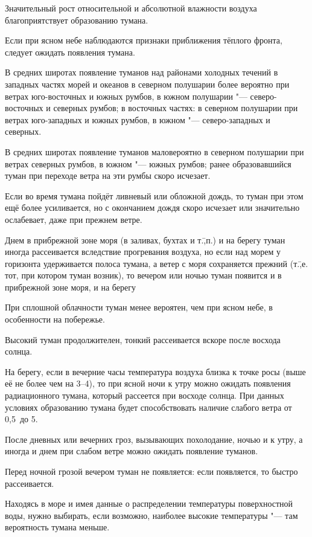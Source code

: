  Значительный рост относительной и абсолютной влажности воздуха
благоприятствует образованию тумана.

 Если при ясном небе наблюдаются признаки приближения тёплого
фронта, следует ожидать появления тумана.

 В средних широтах появление туманов над районами холодных течений
в западных частях морей и океанов в северном полушарии более вероятно
при ветрах юго-восточных и южных румбов, в южном
полушарии "--- северо-восточных и северных румбов; в восточных частях: в
северном полушарии при ветрах юго-западных и южных румбов, в южном "---
северо-западных и северных.

 В средних широтах появление туманов маловероятно в северном
полушарии при ветрах северных румбов, в южном "--- южных румбов; ранее
образовавшийся туман при переходе ветра на эти румбы скоро исчезает.

 Если во время тумана пойдёт ливневый или обложной дождь, то туман
при этом ещё более усиливается, но с окончанием дождя скоро исчезает
или значительно ослабевает, даже при прежнем ветре.

 Днем в прибрежной зоне моря (в заливах, бухтах и т.\=,п.) и на
берегу туман иногда рассеивается вследствие прогревания воздуха, но
если над морем у горизонта удерживается полоса тумана, а ветер с моря
сохраняется прежний (т.\=,е. тот, при котором туман возник), то
вечером или ночью туман появится и в прибрежной зоне моря, и на берегу

 При сплошной облачности туман менее вероятен, чем при ясном
небе, в особенности на побережье.

 Высокий туман продолжителен, тонкий рассеивается вскоре после
восхода солнца.

 На берегу, если в вечерние часы температура воздуха близка к
точке росы (выше её не более чем на 3--4\grC), то при ясной ночи к утру
можно ожидать появления радиационного тумана, который рассеется при
восходе солнца. При данных условиях образованию тумана будет
способствовать наличие слабого ветра от 0,5~до 5\speedms.

 После дневных или вечерних гроз, вызывающих похолодание, ночью
и к утру, а иногда и днем при слабом ветре можно ожидать появление
туманов.

 Перед ночной грозой вечером туман не появляется: если появляется,
то быстро рассеивается.

 Находясь в море и имея данные о распределении температуры
поверхностной воды, нужно выбирать, если возможно, наиболее высокие
температуры "--- там вероятность тумана меньше.

